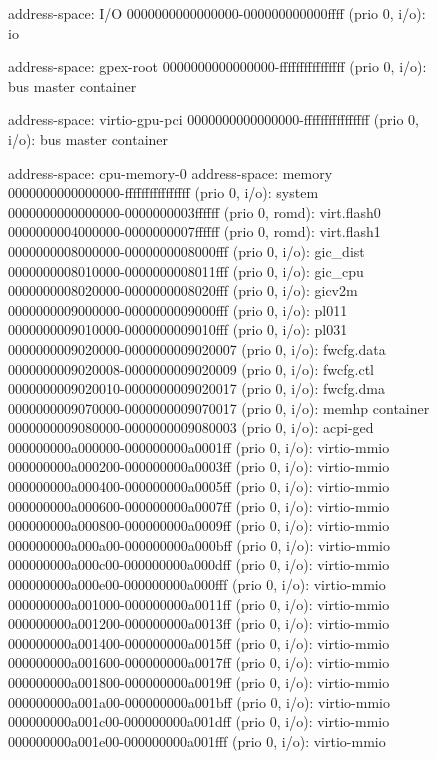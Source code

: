 \begin{figure}[ht]
  \tiny
  \centering
  \begin{minipage}{0.48\linewidth}
  \begin{ffcode}
    address-space: I/O
      0000000000000000-000000000000ffff (prio 0, i/o): io

    address-space: gpex-root
      0000000000000000-ffffffffffffffff (prio 0, i/o): bus master container

    address-space: virtio-gpu-pci
      0000000000000000-ffffffffffffffff (prio 0, i/o): bus master container

    address-space: cpu-memory-0
    address-space: memory
      0000000000000000-ffffffffffffffff (prio 0, i/o): system
        0000000000000000-0000000003ffffff (prio 0, romd): virt.flash0
        0000000004000000-0000000007ffffff (prio 0, romd): virt.flash1
        0000000008000000-0000000008000fff (prio 0, i/o): gic_dist
        0000000008010000-0000000008011fff (prio 0, i/o): gic_cpu
        0000000008020000-0000000008020fff (prio 0, i/o): gicv2m
        0000000009000000-0000000009000fff (prio 0, i/o): pl011
        0000000009010000-0000000009010fff (prio 0, i/o): pl031
        0000000009020000-0000000009020007 (prio 0, i/o): fwcfg.data
        0000000009020008-0000000009020009 (prio 0, i/o): fwcfg.ctl
        0000000009020010-0000000009020017 (prio 0, i/o): fwcfg.dma
        0000000009070000-0000000009070017 (prio 0, i/o): memhp container
        0000000009080000-0000000009080003 (prio 0, i/o): acpi-ged
        000000000a000000-000000000a0001ff (prio 0, i/o): virtio-mmio
        000000000a000200-000000000a0003ff (prio 0, i/o): virtio-mmio
        000000000a000400-000000000a0005ff (prio 0, i/o): virtio-mmio
        000000000a000600-000000000a0007ff (prio 0, i/o): virtio-mmio
        000000000a000800-000000000a0009ff (prio 0, i/o): virtio-mmio
        000000000a000a00-000000000a000bff (prio 0, i/o): virtio-mmio
        000000000a000c00-000000000a000dff (prio 0, i/o): virtio-mmio
        000000000a000e00-000000000a000fff (prio 0, i/o): virtio-mmio
        000000000a001000-000000000a0011ff (prio 0, i/o): virtio-mmio
        000000000a001200-000000000a0013ff (prio 0, i/o): virtio-mmio
        000000000a001400-000000000a0015ff (prio 0, i/o): virtio-mmio
        000000000a001600-000000000a0017ff (prio 0, i/o): virtio-mmio
        000000000a001800-000000000a0019ff (prio 0, i/o): virtio-mmio
        000000000a001a00-000000000a001bff (prio 0, i/o): virtio-mmio
        000000000a001c00-000000000a001dff (prio 0, i/o): virtio-mmio
        000000000a001e00-000000000a001fff (prio 0, i/o): virtio-mmio

\end{ffcode}
\end{minipage}
\end{figure}
